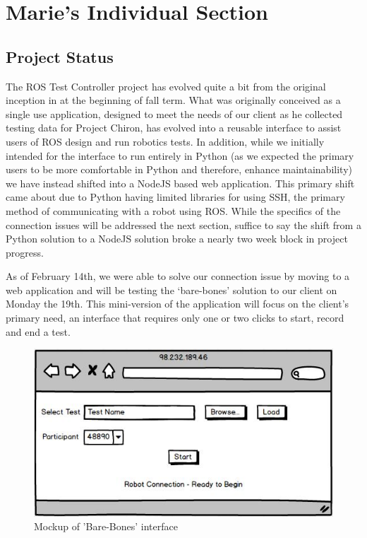 \documentclass[onecolumn, draftclsnofoot,10pt, compsoc]{IEEEtran}
\begin{document}
\section{Marie's Individual Section}
\subsection{Project Status}
The ROS Test Controller project has evolved quite a bit from the original inception in at the beginning of fall term. What was originally conceived as a single use application, designed to meet the needs of our client as he collected testing data for Project Chiron, has evolved into a reusable interface to assist users of ROS design and run robotics tests. In addition, while we initially intended for the interface to run entirely in Python (as we expected the primary users to be more comfortable in Python and therefore, enhance maintainability) we have instead shifted into a NodeJS based web application. This primary shift came about due to Python having limited libraries for using SSH, the primary method of communicating with a robot using ROS. While the specifics of the connection issues will be addressed the next section, suffice to say the shift from a Python solution to a NodeJS solution broke a nearly two week block in project progress. 

As of February 14th, we were able to solve our connection issue by moving to a web application and will be testing the ‘bare-bones’ solution to our client on Monday the 19th. This mini-version of the application will focus on the client’s primary need, an interface that requires only one or two clicks to start, record and end a test.

\begin{figure}[H]
	\centering
	\includegraphics[scale=0.6]{BarebonesMockup.jpg}
	\centering
	\caption{Mockup of 'Bare-Bones' interface}
\end{figure}
\end{document}

